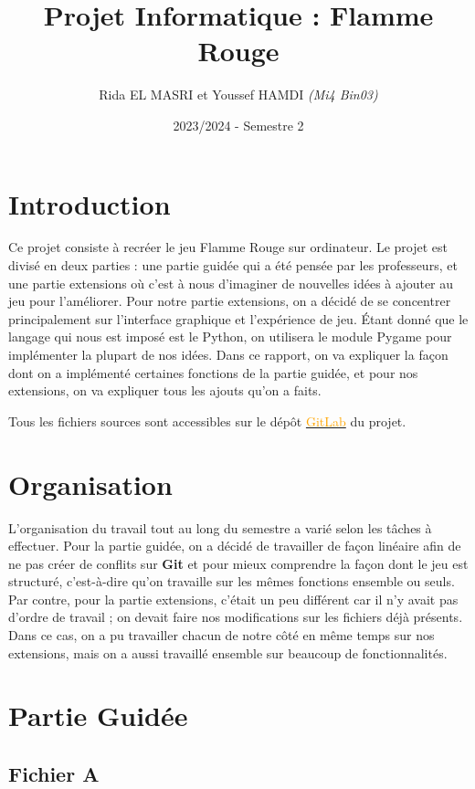\documentclass{article}
\title{Projet Informatique : Flamme Rouge}
\author{Rida EL MASRI et Youssef HAMDI \textsl{(Mi4 Bin03)}}
\date{2023/2024 - Semestre 2}
\begin{document}
\maketitle \medskip
\tableofcontents

\newpage
\section{Introduction}

Ce projet consiste à recréer le jeu Flamme Rouge sur ordinateur. Le projet est divisé en deux parties : une partie guidée qui a été pensée par les professeurs, et une partie extensions où c'est à nous d'imaginer de nouvelles idées à ajouter au jeu pour l'améliorer. Pour notre partie extensions, on a décidé de se concentrer principalement sur l'interface graphique et l'expérience de jeu. Étant donné que le langage qui nous est imposé est le Python, on utilisera le module Pygame pour implémenter la plupart de nos idées. Dans ce rapport, on va expliquer la façon dont on a implémenté certaines fonctions de la partie guidée, et pour nos extensions, on va expliquer tous les ajouts qu'on a faits. \medskip

Tous les fichiers sources sont accessibles sur le dépôt \href{https://gitlab.isima.fr/rielmasri/projet-flamme-rouge-s2}{\textcolor{orange}{GitLab}} du projet.

\section{Organisation}

L'organisation du travail tout au long du semestre a varié selon les tâches à effectuer. Pour la partie guidée, on a décidé de travailler de façon linéaire afin de ne pas créer de conflits sur \textbf{Git} et pour mieux comprendre la façon dont le jeu est structuré, c'est-à-dire qu'on travaille sur les mêmes fonctions ensemble ou seuls. Par contre, pour la partie extensions, c'était un peu différent car il n'y avait pas d'ordre de travail ; on devait faire nos modifications sur les fichiers déjà présents. Dans ce cas, on a pu travailler chacun de notre côté en même temps sur nos extensions, mais on a aussi travaillé ensemble sur beaucoup de fonctionnalités.

\section{Partie Guidée}

\subsection{Fichier A}
\end{document}
